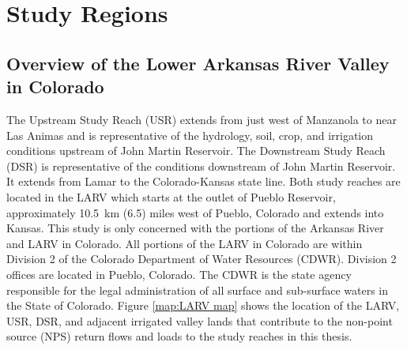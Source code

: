\chapter{Study Regions}
\label{chap:study regions}

\section{Overview of the Lower Arkansas River Valley in Colorado}
\label{overview of the lower arkansas river valley in colorado}

The Upstream Study Reach (USR) extends from just west of Manzanola to near Las Animas and is representative of the hydrology, soil, crop, and irrigation conditions upstream of John Martin Reservoir.  The Downstream Study Reach (DSR) is representative of the conditions downstream of John Martin Reservoir.  It extends from Lamar to the Colorado-Kansas state line.  Both study reaches are located in the LARV which starts at the outlet of Pueblo Reservoir, approximately \SI{10.5}{\kilo\meter} (\SI{6.5}{\mile}) miles west of Pueblo, Colorado and extends into Kansas.  This study is only concerned with the portions of the Arkansas River and LARV in Colorado.  All portions of the LARV in Colorado are within Division 2 of the Colorado Department of Water Resources (CDWR).  Division 2 offices are located in Pueblo, Colorado.  The CDWR is the state agency responsible for the legal administration of all surface and sub-surface waters in the State of Colorado.  Figure \ref{map:LARV map} shows the location of the LARV, USR, DSR, and adjacent irrigated valley lands that contribute to the non-point source (NPS) return flows and loads to the study reaches in this thesis.


